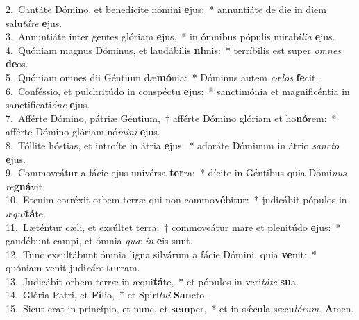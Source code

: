 {2.~}Cantáte Dómino, et benedícite nómini \textbf{e}jus:~* annuntiáte de die in diem salu\textit{tá}\textit{re} \textbf{e}jus.\\
{3.~}Annuntiáte inter gentes glóriam \textbf{e}jus,~* in ómnibus pópulis mirabí\textit{li}\textit{a} \textbf{e}jus.\\
{4.~}Quóniam magnus Dóminus, et laudábilis \textbf{ni}mis:~* terríbilis est super \textit{om}\textit{nes} \textbf{de}os.\\
{5.~}Quóniam omnes dii Géntium dæ\textbf{mó}nia:~* Dóminus autem \textit{cæ}\textit{los} \textbf{fe}cit.\\
{6.~}Conféssio, et pulchritúdo in conspéctu \textbf{e}jus:~* sanctimónia et magnificéntia in sanctificati\textit{ó}\textit{ne} \textbf{e}jus.\\
{7.~}Afférte Dómino, pátriæ Géntium,~† afférte Dómino glóriam et ho\textbf{nó}rem:~* afférte Dómino glóriam nó\textit{mi}\textit{ni} \textbf{e}jus.\\
{8.~}Tóllite hóstias, et introíte in átria \textbf{e}jus:~* adoráte Dóminum in átrio \textit{san}\textit{cto} \textbf{e}jus.\\
{9.~}Commoveátur a fácie ejus univérsa \textbf{ter}ra:~* dícite in Géntibus quia Dómi\textit{nus} \textit{re}\textbf{gná}vit.\\
{10.~}Etenim corréxit orbem terræ qui non commo\textbf{vé}bitur:~* judicábit pópulos in \textit{æ}\textit{qui}\textbf{tá}te.\\
{11.~}Læténtur cæli, et exsúltet terra:~† commoveátur mare et plenitúdo \textbf{e}jus:~* gaudébunt campi, et ómnia \textit{quæ} \textit{in} \textbf{e}is sunt.\\
{12.~}Tunc exsultábunt ómnia ligna silvárum a fácie Dómini, quia \textbf{ve}nit:~* quóniam venit judi\textit{cá}\textit{re} \textbf{ter}ram.\\
{13.~}Judicábit orbem terræ in æqui\textbf{tá}te,~* et pópulos in veri\textit{tá}\textit{te} \textbf{su}a.\\
{14.~}Glória Patri, et \textbf{Fí}lio,~* et Spirí\textit{tu}\textit{i} \textbf{San}cto.\\
{15.~}Sicut erat in princípio, et nunc, et \textbf{sem}per,~* et in sǽcula sæcu\textit{ló}\textit{rum}. \textbf{A}men.\\
